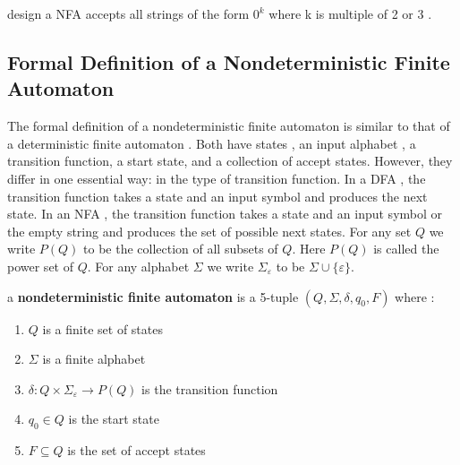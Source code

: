 \documentclass[12pt]{article}
\let\epsilon\varepsilon
\begin{document}
design a NFA accepts all strings of the form $0^{k}$ where k is multiple of 2 or 3 .


\begin{center}
\end{center}





\subsection{Formal Definition of a Nondeterministic Finite Automaton}


The formal definition of a nondeterministic finite automaton is similar to that of
a deterministic finite automaton . Both have states , an input alphabet , a transition
function, a start state, and a collection of accept states. However, they differ in
one essential way: in the type of transition function. In a DFA , the transition
function takes a state and an input symbol and produces the next state. In an
NFA , the transition function takes a state and an input symbol
or the empty string
and produces the set of possible next states.
For any set $Q$ we write $P(Q)$ to be
the collection of all subsets of $Q$.
Here $P(Q)$ is called the power set of $Q$.
For any
alphabet $\Sigma$ we write $\Sigma_{\epsilon}$ to be $\Sigma \cup \{ \epsilon \}$.



\begin{tcolorbox}
a  \textbf{nondeterministic finite automaton} is a 5-tuple $( Q , \Sigma , \delta , q_{0} , F )$ where :
\begin{enumerate}
	\item $Q$ is a finite set of states
	\item $\Sigma$ is a finite alphabet
	\item $\delta : Q \times \Sigma_{\epsilon} \to P(Q)$ is the transition function
	\item $q_{0} \in Q$ is the start state
	\item $F \subseteq Q$ is the set of accept states
\end{enumerate}
\end{tcolorbox}
\end{document}
